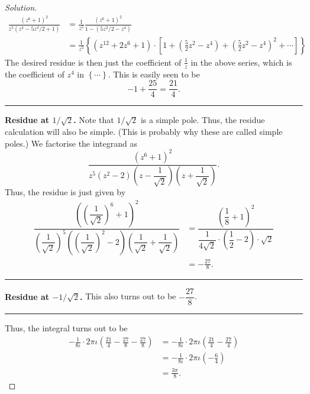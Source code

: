 \documentclass[11pt]{article}
\theoremstyle{definition}
\newenvironment{soln}{\begin{proof}[Solution]}{\end{proof}}
\begin{document}
\begin{enumerate}[leftmargin=*]
\begin{soln}
        \begin{align*}
            \frac{(z^6+1)^2}{z^5(z^4 - 5z^2/2 + 1)} &= \frac{1}{z^5} \frac{(z^6 + 1)^2}{1 - (5z^2/2 - z^4)} \\
            &= \frac{1}{z^5} \left\{ \left( z^{12} + 2z^6 + 1 \right) \cdot \left[ 1 + \left( \frac{5}{2}z^2 - z^4 \right) + \left( \frac{5}{2}z^2 - z^4 \right)^2 + \cdots  \right] \right\}
        \end{align*}
        The desired residue is then just the coefficient of $\frac{1}{z}$ in the above series, which is the coefficient of $z^4$ in $\left\{ \cdots \right\}$. This is easily seen to be 
        \[
            -1 + \frac{25}{4} = \frac{21}{4}.
        \]
        
        \par\noindent\rule{\textwidth}{0.4pt}
        
        \textbf{Residue at $1/\sqrt{2}$.} Note that $1/\sqrt{2}$ is a simple pole. Thus, the residue calculation will also be simple. (This is probably why these are called simple poles.) We factorise the integrand as 
        \[
            \dfrac{(z^6+1)^2}{z^5(z^2-2)\left( z - \dfrac{1}{\sqrt{2}} \right)\left( z + \dfrac{1}{\sqrt{2}} \right)}.
        \]
        Thus, the residue is just given by
        \begin{align*}
            \dfrac{\left(\left( \dfrac{1}{\sqrt{2}} \right)^6+1\right)^2}{\left( \dfrac{1}{\sqrt{2}}\right)^5\left(\left( \dfrac{1}{\sqrt{2}} \right)^2-2\right)\left( \dfrac{1}{\sqrt{2}} + \dfrac{1}{\sqrt{2}} \right)} &= \dfrac{\left( \dfrac{1}{8} +1\right)^2}{ \dfrac{1}{4\sqrt{2}}\cdot\left(\dfrac{1}{2}-2\right)\cdot\sqrt{2}} \\
            &= -\frac{27}{8}.
        \end{align*}
        
        \par\noindent\rule{\textwidth}{0.4pt}
        
        \textbf{Residue at $-1/\sqrt{2}$.} This also turns out to be $-\dfrac{27}{8}$.
        
        \par\noindent\rule{\textwidth}{0.4pt}
        
        Thus, the integral turns out to be
        \begin{align*}
            -\frac{1}{8\iota} \cdot 2\pi\iota \left( \frac{21}{4} - \frac{27}{8} - \frac{27}{8} \right) &= -\frac{1}{8\iota} \cdot 2\pi\iota \left( \frac{21}{4} - \frac{27}{4} \right) \\
            &= -\frac{1}{8\iota} \cdot 2\pi\iota \left( -\frac{6}{4}\right) \\
            &= \boxed{\frac{3\pi}{8}.}
        \end{align*}
    \end{soln}
    

\end{enumerate}
\end{document}
